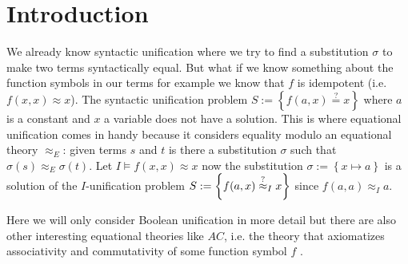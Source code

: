 \section{Introduction}
We already know syntactic unification where we try to find a substitution $\sigma$ to make two terms syntactically equal. But what if we know something about the function symbols in our terms for example we know that $f$ is idempotent (i.e. $f(x,x)\approx x$). The syntactic unification problem $S:=\left\lbrace f(a,x)\stackrel{?}{=}x\right\rbrace$ where $a$ is a constant and $x$ a variable does not have a solution. This is where equational unification comes in handy because it considers equality modulo an equational theory $\approx_E$: given terms $s$ and $t$ is there a substitution $\sigma$ such that $\sigma(s)\approx_E \sigma(t)$. Let $I\models f(x,x)\approx x$ now the substitution $\sigma:=\left\lbrace x\mapsto a\right\rbrace $ is a solution of the $I$-unification problem $S:=\left\lbrace f(a,x)\stackrel{?}{\approx}_I x\right\rbrace$ since $f(a,a)\approx_Ia$. 

Here we will only consider Boolean unification in more detail but there are also other interesting equational theories like $AC$, i.e. the theory that axiomatizes associativity and commutativity of some function symbol $f$ \cite{TRS}.
